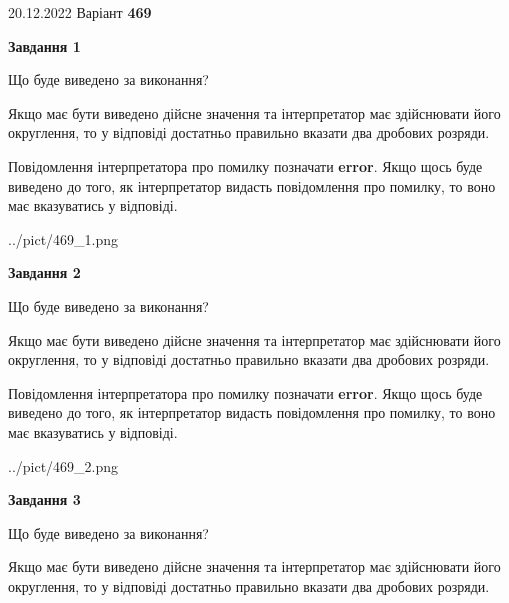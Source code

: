 \documentclass[12pt, ukrainian]{article}
\begin{document}
{20.12.2022 Варіант \No \textbf { 469 }\par}
{
\begin {Large}

{\begin {center}\textbf{Завдання 1}\end {center}}\par
Що буде виведено за виконання? \par

Якщо має бути виведено дійсне значення та інтерпретатор має здійснювати його округлення, 
то у відповіді достатньо правильно вказати два дробових розряди.

Повідомлення інтерпретатора про помилку позначати \textbf{error}.
Якщо щось буде виведено до того, як інтерпретатор видасть повідомлення про помилку, 
то воно має вказуватись у відповіді. \par

\begin{center}
	{../pict/469_1.png}
\end{center}
\newpage

{\begin {center}\textbf{Завдання 2}\end {center}}\par
Що буде виведено за виконання? \par

Якщо має бути виведено дійсне значення та інтерпретатор має здійснювати його округлення, 
то у відповіді достатньо правильно вказати два дробових розряди.

Повідомлення інтерпретатора про помилку позначати \textbf{error}.
Якщо щось буде виведено до того, як інтерпретатор видасть повідомлення про помилку, 
то воно має вказуватись у відповіді. \par

\begin{center}
	{../pict/469_2.png}
\end{center}
\newpage

{\begin {center}\textbf{Завдання 3}\end {center}}\par
Що буде виведено за виконання? \par

Якщо має бути виведено дійсне значення та інтерпретатор має здійснювати його округлення, 
то у відповіді достатньо правильно вказати два дробових розряди.


\end{Large}}
\end{document}
